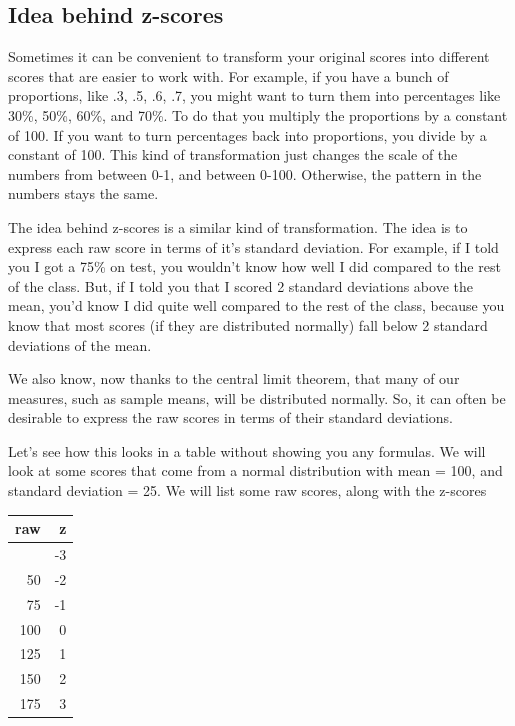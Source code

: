 \documentclass[
  letterpaper,
  DIV=11,
  numbers=noendperiod]{scrreprt}
\begin{document}
\subsection{Idea behind z-scores}\label{idea-behind-z-scores}

Sometimes it can be convenient to transform your original scores into
different scores that are easier to work with. For example, if you have
a bunch of proportions, like .3, .5, .6, .7, you might want to turn them
into percentages like 30\%, 50\%, 60\%, and 70\%. To do that you
multiply the proportions by a constant of 100. If you want to turn
percentages back into proportions, you divide by a constant of 100. This
kind of transformation just changes the scale of the numbers from
between 0-1, and between 0-100. Otherwise, the pattern in the numbers
stays the same.

The idea behind z-scores is a similar kind of transformation. The idea
is to express each raw score in terms of it's standard deviation. For
example, if I told you I got a 75\% on test, you wouldn't know how well
I did compared to the rest of the class. But, if I told you that I
scored 2 standard deviations above the mean, you'd know I did quite well
compared to the rest of the class, because you know that most scores (if
they are distributed normally) fall below 2 standard deviations of the
mean.

We also know, now thanks to the central limit theorem, that many of our
measures, such as sample means, will be distributed normally. So, it can
often be desirable to express the raw scores in terms of their standard
deviations.

Let's see how this looks in a table without showing you any formulas. We
will look at some scores that come from a normal distribution with mean
= 100, and standard deviation = 25. We will list some raw scores, along
with the z-scores

\begin{longtable}[]{@{}rr@{}}
\toprule\noalign{}
raw & z \\
\midrule\noalign{}
\endhead
\bottomrule\noalign{}
\endlastfoot
25 & -3 \\
50 & -2 \\
75 & -1 \\
100 & 0 \\
125 & 1 \\
150 & 2 \\
175 & 3 \\
\end{longtable}
\end{document}
